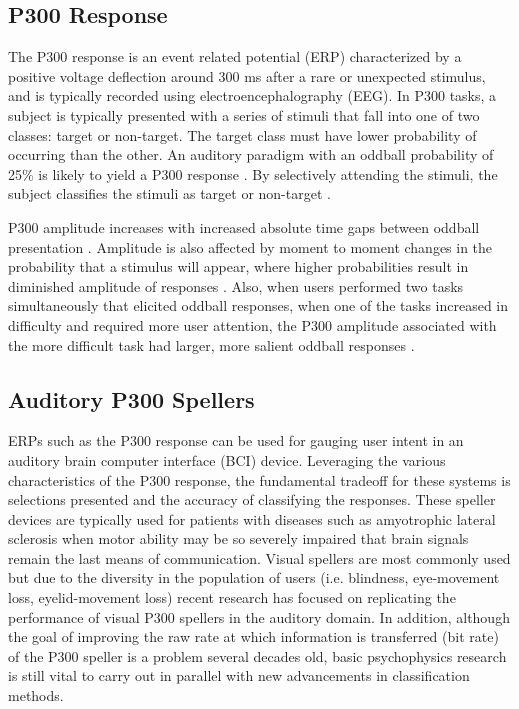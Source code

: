 \documentclass[10pt]{article}
\begin{document}
\subsection{P300 Response} 
The P300 response is an event related
potential (ERP) characterized by a positive voltage deflection
around 300 ms after a rare or unexpected stimulus, and is typically recorded
using electroencephalography (EEG). In P300 tasks, a subject is
typically presented with a series of stimuli that fall into one of
two classes: target or non-target.  The target class must have lower
probability of occurring than the other. An auditory paradigm with
an oddball probability of 25\% is likely to yield a P300
response \cite{Nijboer2008}.  By selectively attending the stimuli, the subject
classifies the stimuli as target or non-target \cite{Wolpaw2012}.

P300 amplitude increases with increased absolute time gaps
between oddball presentation \cite{Gonsalvez2002}. 
Amplitude is also affected by moment to moment changes in the
probability that a stimulus will appear, where higher probabilities
result in diminished amplitude of responses
\cite{Donchin1981}.  Also, when users performed two tasks
simultaneously that elicited oddball responses, when one of
the tasks increased in difficulty and required more user
attention, the P300 amplitude associated with the more
difficult task had larger, more salient oddball responses
\cite{Sirevaag1989}. 

\subsection{Auditory P300 Spellers} 

ERPs such as the P300 response can be used for gauging user
intent in an auditory brain computer interface (BCI) device.
Leveraging the various characteristics of the P300 response,
the fundamental tradeoff for these systems is selections
presented and the accuracy of classifying the responses.  These
speller devices are typically used for patients with diseases
such as amyotrophic lateral sclerosis when motor ability may
be so severely impaired that brain signals remain the last means
of communication\cite{Nijboer2008}.  Visual spellers are most
commonly used but due to the diversity in the population of
users (i.e.  blindness, eye-movement loss, eyelid-movement
loss) recent research has focused on replicating the
performance of visual P300 spellers in the auditory
domain\cite{Hohne2011}.  In addition, although the goal of
improving the raw rate at which information is transferred
(bit rate) of the P300 speller is a problem several decades
old, basic psychophysics research is still vital to carry out
in parallel with new advancements in classification methods.
\end{document}
